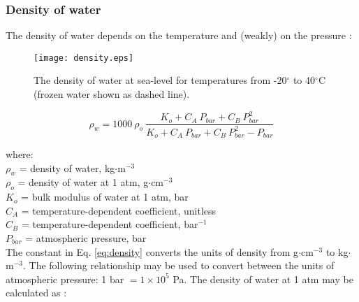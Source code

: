 \subsubsection{Density of water}
\label{sec:density}
The density of water depends on the temperature and (weakly) on the pressure \parencite{chen77}:

\begin{figure}[ht!]
    \texttt{[image: density.eps]}
    \caption{The density of water at sea-level for temperatures from -20$^{\circ}$ to 40$^{\circ}$C (frozen water shown as dashed line).}
    \label{fig:density}
\end{figure}

\begin{equation}
\label{eq:density}
	\rho_w = 1000\: \rho_o \:\frac{K_o+C_A\: P_{bar}+C_B\: P_{bar}^2}
	               {K_o+C_A\: P_{bar} + C_B\: P_{bar}^2 - P_{bar}}
\end{equation}

\noindent where: \\
\indent $\rho_w$ = density of water, kg$\cdot$m$^{-3}$\\
\indent $\rho_o$ = density of water at 1 atm, g$\cdot$cm$^{-3}$\\
\indent $K_o$ = bulk modulus of water at 1 atm, bar\\
\indent $C_A$ = temperature-dependent coefficient, unitless\\
\indent $C_B$ = temperature-dependent coefficient, bar$^{-1}$\\
\indent $P_{bar}$ = atmospheric pressure, bar\\

\noindent The constant in Eq. \ref{eq:density} converts the units of density from g$\cdot$cm$^{-3}$ to kg$\cdot$m$^{-3}$. 
The following relationship may be used to convert between the units of atmospheric pressure: 1 bar $= 1\times 10^5$ Pa. 
The density of water at 1 atm may be calculated as \parencite{chen77, kell75}:

